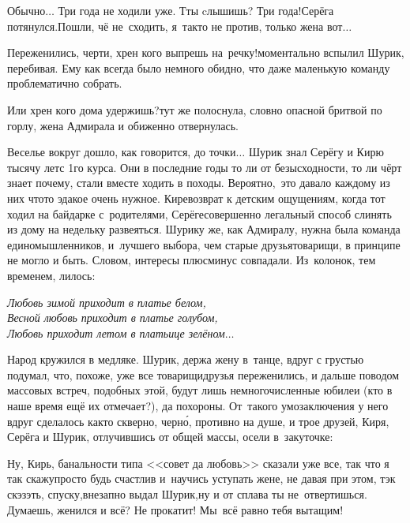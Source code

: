 {\diagdash Обычно$\ldots$ Три года не ходили уже. Т\sdash ты cлышишь? Три года!\mdash Серёга потянулся.\mdash Пошли, чё не~сходить, я~так\sdash то не против, только жена вот$\ldots$

\diagdash Переженились, черти, хрен кого выпрешь на~речку!\mdash моментально вспылил Шурик, перебивая. Ему как всегда было немного обидно, что даже маленькую команду проблематично собрать.

\diagdash Или хрен кого дома удержишь?\mdash тут же полоснула, словно опасной бритвой по горлу, жена Адмирала и обиженно отвернулась. 

Веселье вокруг дошло, как говорится, до точки$\ldots$ Шурик знал Серёгу и Кирю тысячу лет\mdash с 1\sdash го курса. Они в последние годы то ли от безысходности, то ли чёрт знает почему, стали вместе ходить в походы. Вероятно,~это давало каждому из них что\sdash то эдакое очень нужное. Кире\mdash возврат к детским ощущениям, когда тот ходил на байдарке с~родителями, Серёге\mdash совершенно легальный способ слинять из дому на недельку развеяться. Шурику же, как Адмиралу, нужна была команда единомышленников, и~лучшего выбора, чем старые друзья\sdash товарищи, в принципе не могло и быть. Словом, интересы плюс\sdash минус совпадали. Из~колонок, тем временем, лилось:

\vspace{0.3cm}
\noindent\textit{%
	\hspace*{1.4cm}Любовь зимой приходит в платье белом,\\
	\hspace*{1.4cm}Весной любовь приходит в платье голубом,\\
	\hspace*{1.4cm}Любовь приходит летом в платьице зелёном$\ldots$
}
\vspace{0.3cm}

Народ кружился в медляке. Шурик, держа жену в~танце, вдруг с грустью подумал, что, похоже, уже все товарищи\sdash друзья переженились, и дальше поводом массовых встреч, подобных этой, будут лишь немногочисленные юбилеи (кто в наше время ещё их отмечает?), да похороны. От~такого умозаключения у него вдруг сделалось как\sdash то скверно, черн\'{о}, противно на душе, и трое друзей, Киря, Серёга и Шурик, отлучившись от общей массы, осели в~закуточке:

\diagdash Ну, Кирь, банальности типа <<совет да любовь>> сказали уже все, так что я так скажу\mdash просто будь счастлив и~научись уступать жене, не давая при этом, тэк скэзэть, спуску,\mdash внезапно выдал Шурик,\mdash ну и от сплава ты не~отвертишься. Думаешь, женился и всё? Не прокатит! Мы~всё равно тебя вытащим!

}
